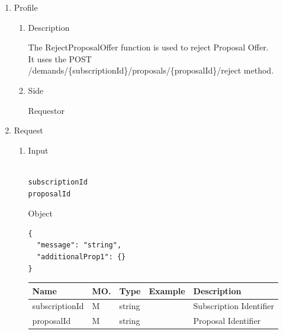 \begin{enumerate}

\item Profile

\begin{enumerate}

\item Description

The RejectProposalOffer function is used to reject Proposal Offer. \\
It uses the POST /demands/\{subscriptionId\}/proposals/\{proposalId\}/reject method.

\item Side

Requestor

\end{enumerate}

\item Request

\begin{enumerate}

\item Input

\begin{tcolorbox}[boxrule=0pt, frame empty]
\begin{verbatim}

subscriptionId
proposalId

\end{verbatim}
\end{tcolorbox}

Object
\begin{tcolorbox}[boxrule=0pt, frame empty]
\begin{verbatim}
{
  "message": "string",
  "additionalProp1": {}
}
\end{verbatim}
\end{tcolorbox}

\begin{table}[H]
\footnotesize

\begin{center}
\begin{tabular}{|p{3cm}|l|p{3cm}|p{3cm}|p{4cm}|} 
\hline
\rowcolor{lightgray}	Name	& MO.	& Type	& Example & 	Description \\
\hline

subscriptionId		& M	& 	string			&		&	Subscription Identifier \\ 

\hline

proposalId			& M & 	string			&		&	Proposal Identifier \\


\end{tabular}
\end{center}
\end{table}
\end{enumerate}
\end{enumerate}
